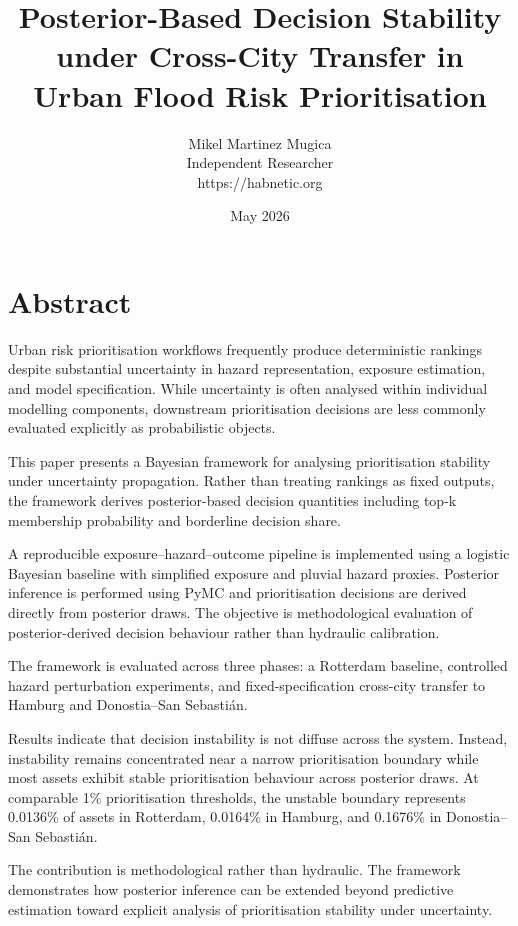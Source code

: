 \documentclass[
]{article}
\title{Posterior-Based Decision Stability under Cross-City Transfer in
Urban Flood Risk Prioritisation}
\author{Mikel Martinez Mugica\\
Independent Researcher\\
https://habnetic.org}
\date{May 2026}
\begin{document}
\maketitle

{
\setcounter{tocdepth}{3}
\tableofcontents
}
\section{Abstract}\label{abstract}

Urban risk prioritisation workflows frequently produce deterministic
rankings despite substantial uncertainty in hazard representation,
exposure estimation, and model specification. While uncertainty is often
analysed within individual modelling components, downstream
prioritisation decisions are less commonly evaluated explicitly as
probabilistic objects.

This paper presents a Bayesian framework for analysing prioritisation
stability under uncertainty propagation. Rather than treating rankings
as fixed outputs, the framework derives posterior-based decision
quantities including top-k membership probability and borderline
decision share.

A reproducible exposure–hazard–outcome pipeline is implemented using a
logistic Bayesian baseline with simplified exposure and pluvial hazard
proxies. Posterior inference is performed using PyMC and prioritisation
decisions are derived directly from posterior draws. The objective is
methodological evaluation of posterior-derived decision behaviour rather
than hydraulic calibration.

The framework is evaluated across three phases: a Rotterdam baseline,
controlled hazard perturbation experiments, and fixed-specification
cross-city transfer to Hamburg and Donostia–San Sebastián.

Results indicate that decision instability is not diffuse across the
system. Instead, instability remains concentrated near a narrow
prioritisation boundary while most assets exhibit stable prioritisation
behaviour across posterior draws. At comparable 1\% prioritisation
thresholds, the unstable boundary represents 0.0136\% of assets in
Rotterdam, 0.0164\% in Hamburg, and 0.1676\% in Donostia–San Sebastián.

The contribution is methodological rather than hydraulic. The framework
demonstrates how posterior inference can be extended beyond predictive
estimation toward explicit analysis of prioritisation stability under
uncertainty.
\end{document}

